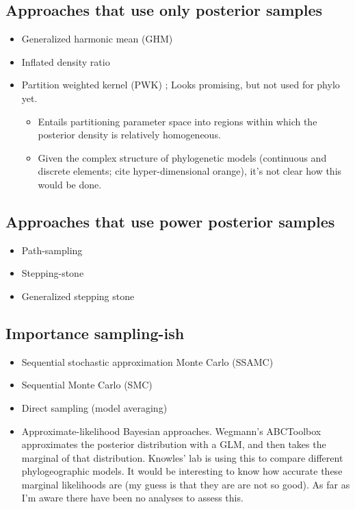 \subsection{Approaches that use only posterior samples}

\begin{itemize}
    \item Generalized harmonic mean (GHM) \citep{Gelfand1994}
    \item Inflated density ratio \citep{Arima2012}
    \item Partition weighted kernel (PWK) \cite{Wang2017}; Looks promising, but
        not used for phylo yet.
        \begin{itemize}
            \item Entails partitioning parameter space into regions within which the
                posterior density is relatively homogeneous.
            \item Given the complex structure of phylogenetic models
                (continuous and discrete elements; cite hyper-dimensional
                orange), it's not clear how this would be done.
        \end{itemize}
\end{itemize}

\subsection{Approaches that use power posterior samples}

\begin{itemize}
    \item Path-sampling \citep{Lartillot2006}
    \item Stepping-stone \citep{Xie2011}
    \item Generalized stepping stone \citep{Fan2011}
\end{itemize}

\subsection{Importance sampling-ish}

\begin{itemize}
    \item Sequential stochastic approximation Monte Carlo (SSAMC)
        \citep{Liang2007,Cheon2008}
    \item Sequential Monte Carlo (SMC) \citep{Jordan2012}
    \item Direct sampling (model averaging)
    \item Approximate-likelihood Bayesian approaches. Wegmann's ABCToolbox
        approximates the posterior distribution with a GLM, and then takes the
        marginal of that distribution. Knowles' lab is using this to compare
        different phylogeographic models. It would be interesting to know how
        accurate these marginal likelihoods are (my guess is that they are are
        not so good). As far as I'm aware there have been no analyses to assess
        this.
\end{itemize}

